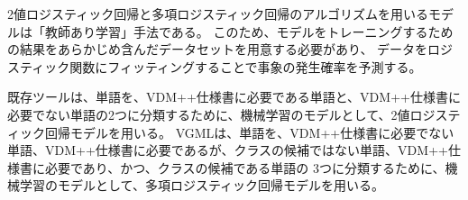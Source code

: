 2値ロジスティック回帰と多項ロジスティック回帰のアルゴリズムを用いるモデルは「教師あり学習」手法である。
このため、モデルをトレーニングするための結果をあらかじめ含んだデータセットを用意する必要があり、
データをロジスティック関数にフィッティングすることで事象の発生確率を予測する。

既存ツールは、単語を、VDM++仕様書に必要である単語と、VDM++仕様書に必要でない単語の2つに分類するために、機械学習のモデルとして、2値ロジスティック回帰モデルを用いる。
VGMLは、単語を、VDM++仕様書に必要でない単語、VDM++仕様書に必要であるが、クラスの候補ではない単語、VDM++仕様書に必要であり、かつ、クラスの候補である単語の
3つに分類するために、機械学習のモデルとして、多項ロジスティック回帰モデルを用いる。